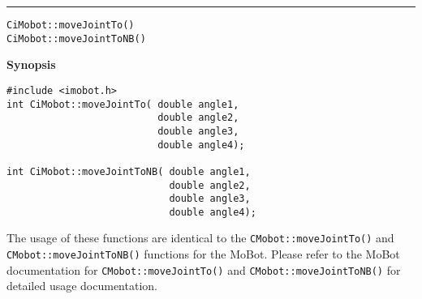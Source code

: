 \noindent
\vspace{5pt}
\rule{6.5in}{0.015in}
\noindent
{\LARGE \texttt{CiMobot::moveJointTo()}}\\
{\LARGE \texttt{CiMobot::moveJointToNB()}}\\
{}

\noindent
{\bf Synopsis}\\
\begin{verbatim}
#include <imobot.h>
int CiMobot::moveJointTo( double angle1, 
                          double angle2, 
                          double angle3, 
                          double angle4);

int CiMobot::moveJointToNB( double angle1, 
                            double angle2, 
                            double angle3, 
                            double angle4);
\end{verbatim}

The usage of these functions are identical to the
\texttt{CMobot::moveJointTo()} and \texttt{CMobot::moveJointToNB()} functions for the MoBot.
Please refer to the MoBot documentation for \texttt{CMobot::moveJointTo()} and
\texttt{CMobot::moveJointToNB()} for
detailed usage documentation.

